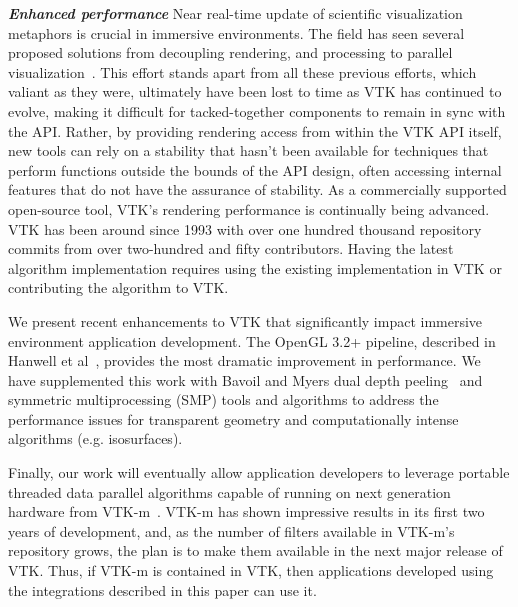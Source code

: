 
\textit{\textbf{Enhanced performance}} Near real-time update of scientific visualization metaphors is crucial in immersive environments.
The field has seen several proposed solutions from decoupling rendering, and processing to parallel visualization~\cite{Bryson:1996, van2000vista}.
This effort stands apart from all these previous efforts, which valiant
as they were, ultimately have been lost to time as VTK has continued to
evolve, making it difficult for tacked-together components to remain in
sync with the API.
Rather, by providing rendering access from within the VTK API itself, new
tools can rely on a stability that hasn't been available for techniques
that perform functions outside the bounds of the API design, often accessing
internal features that do not have the assurance of stability.
As a commercially supported open-source tool, VTK's rendering performance is
continually being advanced.
VTK has been around since 1993 with over one hundred thousand repository commits from over two-hundred and fifty contributors.
Having the latest algorithm implementation requires using the existing implementation in VTK or contributing the algorithm to VTK.

We present recent enhancements to VTK that significantly impact immersive
environment application development. The OpenGL 3.2+ pipeline, described in Hanwell et al~\cite{Hanwell:2015}, provides the most dramatic improvement in performance. We have supplemented this work with Bavoil and Myers dual depth peeling~\cite{Bavoil:2008} and symmetric multiprocessing (SMP) tools and algorithms to address the performance issues for transparent geometry and computationally intense algorithms (e.g. isosurfaces).

Finally, our work will eventually allow application developers to leverage portable threaded data parallel algorithms capable of running on next generation hardware from VTK-m~\cite{Moreland:2016}. VTK-m has shown impressive results in its first two years of development, and, as the number of filters available in VTK-m's repository grows, the plan is to make them available in the next major release of VTK. Thus, if VTK-m is contained in VTK, then applications developed using the integrations described in this paper can use it.


